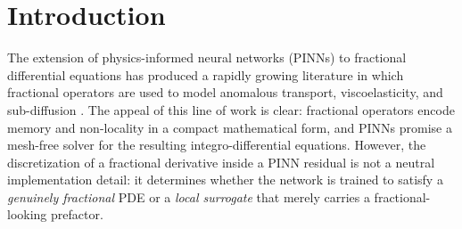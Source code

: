 \documentclass[11pt]{article}
\begin{document}
\newpage

\section{Introduction}
\label{sec:intro}

The extension of physics-informed neural networks (PINNs) \cite{Raissi2019} to fractional differential equations has produced a rapidly growing literature in which fractional operators are used to model anomalous transport, viscoelasticity, and sub-diffusion \cite{Pang2019, Toan2025}. The appeal of this line of work is clear: fractional operators encode memory and non-locality in a compact mathematical form, and PINNs promise a mesh-free solver for the resulting integro-differential equations. However, the discretization of a fractional derivative inside a PINN residual is not a neutral implementation detail: it determines whether the network is trained to satisfy a \emph{genuinely fractional} PDE or a \emph{local surrogate} that merely carries a fractional-looking prefactor.
\end{document}
